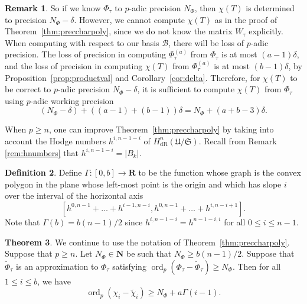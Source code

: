 \documentclass[a4paper,11pt]{article}
\numberwithin{equation}{section}
\providecommand{\card}[1]{\lvert#1\rvert}                %
\newcommand{\NN}{\mathbf{N}} %
\newcommand{\RR}{\mathbf{R}} %
\DeclareMathOperator{\ord}{ord}          %
\providecommand{\HdR}{H_{\text{dR}}}    %
\providecommand{\cB}{\mathcal{B}} %
\theoremstyle{definition}
\newtheorem{thm}{Theorem}[section]
\newtheorem{defn}[thm]{Definition}
\newtheorem{rem}[thm]{Remark}
\begin{document}
\begin{rem} \label{rem:workprecchi}
So if we know $\Phi_{\tau}$ to $p$-adic precision $N_{\Phi}$, then
$\chi(T)$ is determined to precision $N_{\Phi}-\delta$.
However, we cannot compute $\chi(T)$ as in the proof of 
Theorem~\ref{thm:preccharpoly}, since we do not know the matrix 
$W_{\tau}$ explicitly. When computing with respect to our basis $\cB$,
there will be loss of $p$-adic precision. The loss of precision 
in computing $\Phi_{\tau}^{(a)}$ from $\Phi_{\tau}$ is at most 
$(a-1)\delta$, and the loss of 
precision in computing $\chi(T)$ from $\Phi_{\tau}^{(a)}$ 
is at most $(b-1) \delta$, by Proposition~\ref{prop:productval} and 
Corollary~\ref{cor:delta}. Therefore, for $\chi(T)$ to be correct
to $p$-adic precision $N_{\Phi}-\delta$, it is sufficient to compute 
$\chi(T)$ from $\Phi_{\tau}$ using $p$-adic working precision 
\[
(N_{\Phi}-\delta)+((a-1)+(b-1))\delta=N_{\Phi}+(a+b-3)\delta.
\] 
\end{rem}

When $p \geq n$, one can improve Theorem~\ref{thm:preccharpoly} by taking into 
account the Hodge numbers $h^{i,n-1-i}$ of $\HdR^{n}(\mathfrak{U}/\mathfrak{S})$.
Recall from Remark \ref{rem:hnumbers} that $h^{i,n-1-i}=\card{B_k}$.

\begin{defn}
Define $\Gamma: [0,b] \rightarrow \RR$ to be the function whose graph is the convex 
polygon in the plane whose left-most point is the origin and which has slope $i$ over
the interval of the horizontal axis 
\[
[h^{0,n-1}+\dotsc+h^{i-1,n-i},h^{0,n-1}+\dotsc+h^{i,n-i+1}].
\]
Note that $\Gamma(b)=b(n-1)/2$ since $h^{i,n-1-i}=h^{n-1-i,i}$ for all $0 \leq i \leq n-1$.
\end{defn}

\begin{thm} \label{thm:pgeqn}
We continue to use the notation of Theorem~\ref{thm:preccharpoly}. Suppose that $p \geq n$. 
Let $N_{\Phi} \in \NN$ be such that $N_{\Phi} \geq b(n-1)/2$. Suppose that $\tilde{\Phi}_{\tau}$ 
is an approximation to $\Phi_{\tau}$ satisfying $\ord_p (\Phi_{\tau}-\tilde{\Phi}_{\tau}) \geq N_{\Phi}$. 
Then for all $1 \leq i \leq b$, we have
\[
\ord_p(\chi_i-\tilde{\chi}_i) \geq N_{\Phi} + a\Gamma(i-1).
\]
\end{thm}
 
\end{document}
